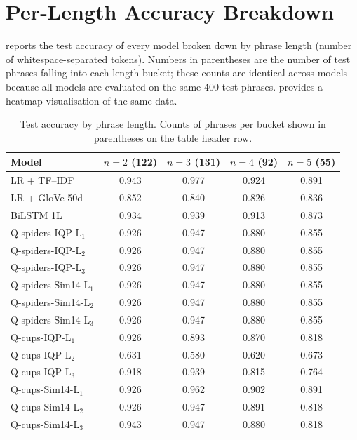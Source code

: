 \documentclass[runningheads]{llncs}
\begin{document}
\section{Per-Length Accuracy Breakdown}\label{app:perlength}

 reports the test accuracy of every model broken
down by phrase length (number of whitespace-separated tokens). Numbers in
parentheses are the number of test phrases falling into each length
bucket; these counts are identical across models because all models are
evaluated on the same 400 test phrases.  provides
a heatmap visualisation of the same data.

\begin{table}[h!]
\centering
\caption{Test accuracy by phrase length. Counts of phrases per bucket
shown in parentheses on the table header row.}
\label{tab:perlength-full}
\setlength{\tabcolsep}{4pt}
\small
\begin{tabular}{lcccc}
\toprule
Model & $n=2$ (122) & $n=3$ (131) & $n=4$ (92) & $n=5$ (55) \\
\midrule
LR + TF--IDF             & 0.943 & 0.977 & 0.924 & 0.891 \\
LR + GloVe-50d           & 0.852 & 0.840 & 0.826 & 0.836 \\
BiLSTM 1L                & 0.934 & 0.939 & 0.913 & 0.873 \\
\midrule
Q-spiders-IQP-L\(_1\)    & 0.926 & 0.947 & 0.880 & 0.855 \\
Q-spiders-IQP-L\(_2\)    & 0.926 & 0.947 & 0.880 & 0.855 \\
Q-spiders-IQP-L\(_3\)    & 0.926 & 0.947 & 0.880 & 0.855 \\
Q-spiders-Sim14-L\(_1\)  & 0.926 & 0.947 & 0.880 & 0.855 \\
Q-spiders-Sim14-L\(_2\)  & 0.926 & 0.947 & 0.880 & 0.855 \\
Q-spiders-Sim14-L\(_3\)  & 0.926 & 0.947 & 0.880 & 0.855 \\
\midrule
Q-cups-IQP-L\(_1\)       & 0.926 & 0.893 & 0.870 & 0.818 \\
Q-cups-IQP-L\(_2\)       & 0.631 & 0.580 & 0.620 & 0.673 \\
Q-cups-IQP-L\(_3\)       & 0.918 & 0.939 & 0.815 & 0.764 \\
Q-cups-Sim14-L\(_1\)     & 0.926 & 0.962 & 0.902 & 0.891 \\
Q-cups-Sim14-L\(_2\)     & 0.926 & 0.947 & 0.891 & 0.818 \\
Q-cups-Sim14-L\(_3\)     & 0.943 & 0.947 & 0.880 & 0.818 \\
\bottomrule
\end{tabular}
\end{table}
\end{document}
